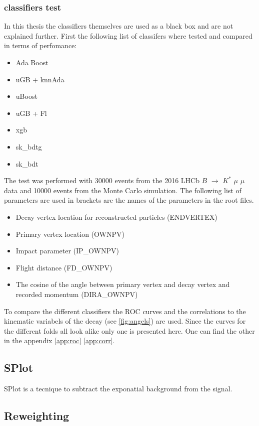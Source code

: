\documentclass[english]{uzhpub}
\begin{document}
\subsubsection{classifiers test}
In this thesis the classifiers themselves are used as a black box and are not explained further.
First the following list of classifers where tested and compared in terms of perfomance:
\begin{itemize}
  \item Ada Boost
  \item uGB + knnAda
  \item uBoost
  \item uGB + Fl
  \item xgb
  \item sk\_bdtg
  \item sk\_bdt
\end{itemize}
The test was performed with 30000 events from the 2016 LHCb $B$ $\rightarrow$ $K^{*}$ $\mu$ $\mu$ data and 10000 events from the Monte Carlo simulation. The following list of parameters are used in brackets are the names of the parameters in the root files.
\begin{itemize}
  \item Decay vertex location for reconstructed particles (ENDVERTEX)
  \item Primary vertex location (OWNPV)
  \item Impact parameter (IP\_OWNPV)
  \item Flight distance (FD\_OWNPV)
  \item The cosine of the angle between primary vertex and decay vertex and recorded momentum (DIRA\_OWNPV)
\end{itemize}
To compare the different classifiers the ROC curves and the correlations to the kinematic variabels of the decay (see \ref{fig:angels}) are used. Since the curves for the different folds all look alike only one is presented here. One can find the other in the appendix \ref{app:roc} \ref{app:corr}.

\subsection{SPlot}
SPlot is a tecnique to subtract the exponatial background from the signal.



\subsection{Reweighting}
\end{document}
